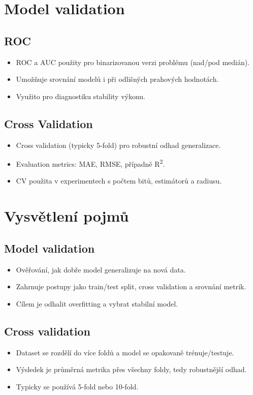 \documentclass[12pt]{article}
\begin{document}
\section{Model validation}
\subsection{ROC}
\begin{itemize}
  \item ROC a AUC použity pro binarizovanou verzi problému (nad/pod medián).
  \item Umožňuje srovnání modelů i při odlišných prahových hodnotách.
  \item Využito pro diagnostiku stability výkonu.
\end{itemize}
\subsection{Cross Validation}
\begin{itemize}
  \item Cross validation (typicky 5-fold) pro robustní odhad generalizace.
  \item Evaluation metrics: MAE, RMSE, případně R\textsuperscript{2}.
  \item CV použita v experimentech s počtem bitů, estimátorů a radiusu.
\end{itemize}

\section{Vysvětlení pojmů}
\subsection{Model validation}
\begin{itemize}
  \item Ověřování, jak dobře model generalizuje na nová data.
  \item Zahrnuje postupy jako train/test split, cross validation a srovnání metrik.
  \item Cílem je odhalit overfitting a vybrat stabilní model.
\end{itemize}
\subsection{Cross validation}
\begin{itemize}
  \item Dataset se rozdělí do více foldů a model se opakovaně trénuje/testuje.
  \item Výsledek je průměrná metrika přes všechny foldy, tedy robustnější odhad.
  \item Typicky se používá 5-fold nebo 10-fold.
\end{itemize}
\end{document}
